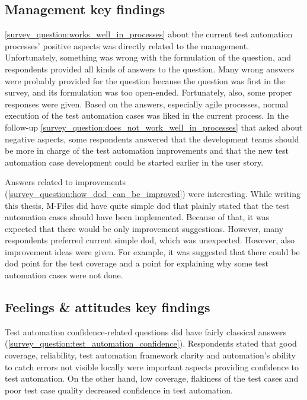 \subsection{Management key findings}
\autoref{survey_question:works_well_in_processes} about the current test automation processes' positive aspects was directly related to the management. Unfortunately, something was wrong with the formulation of the question, and respondents provided all kinds of answers to the question. Many wrong answers were probably provided for the question because the question was first in the survey, and its formulation was too open-ended. Fortunately, also, some proper responses were given. Based on the answers, especially agile processes, normal execution of the test automation cases was liked in the current process. In the follow-up \autoref{survey_question:does_not_work_well_in_processes} that asked about negative aspects, some respondents answered that the development teams should be more in charge of the test automation improvements and that the new test automation case development could be started earlier in the user story.

Answers related to  improvements (\autoref{survey_question:how_dod_can_be_improved}) were interesting. While writing this thesis, M-Files did have quite simple \gls{dod} that plainly stated that the test automation cases should have been implemented. Because of that, it was expected that there would be only improvement suggestions. However, many respondents preferred current simple \gls{dod}, which was unexpected. However, also improvement ideas were given. For example, it was suggested that there could be \gls{dod} point for the test coverage and a point for explaining why some test automation cases were not done.

\subsection{Feelings \& attitudes key findings}\label{subsection:feelings_and_attitudes_key_findings}
Test automation confidence-related questions did have fairly classical answers (\autoref{survey_question:test_automation_confidence}). Respondents stated that good coverage, reliability, test automation framework clarity and automation's ability to catch errors not visible locally were important aspects providing confidence to test automation. On the other hand, low coverage, flakiness of the test cases and poor test case quality decreased confidence in test automation.

